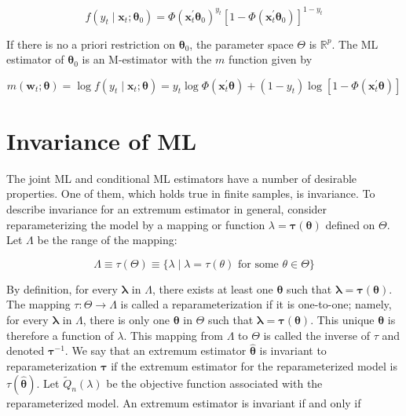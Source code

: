 \documentclass[10pt]{article}
\begin{document}
$$
f\left(y_{t} \mid \mathbf{x}_{t} ; \boldsymbol{\theta}_{0}\right)=\Phi\left(\mathbf{x}_{t}^{\prime} \boldsymbol{\theta}_{0}\right)^{y_{t}}\left[1-\Phi\left(\mathbf{x}_{t}^{\prime} \boldsymbol{\theta}_{0}\right)\right]^{1-y_{t}}
$$

If there is no a priori restriction on $\boldsymbol{\theta}_{0}$, the parameter space $\Theta$ is $\mathbb{R}^{p}$. The ML estimator of $\boldsymbol{\theta}_{0}$ is an M-estimator with the $m$ function given by


\begin{equation*}
m\left(\mathbf{w}_{t} ; \boldsymbol{\theta}\right)=\log f\left(y_{t} \mid \mathbf{x}_{t} ; \boldsymbol{\theta}\right)=y_{t} \log \Phi\left(\mathbf{x}_{t}^{\prime} \boldsymbol{\theta}\right)+\left(1-y_{t}\right) \log \left[1-\Phi\left(\mathbf{x}_{t}^{\prime} \boldsymbol{\theta}\right)\right] \tag{7.1.15}
\end{equation*}


\section*{Invariance of ML}
The joint ML and conditional ML estimators have a number of desirable properties. One of them, which holds true in finite samples, is invariance. To describe invariance for an extremum estimator in general, consider reparameterizing the model by a mapping or function $\lambda=\boldsymbol{\tau}(\boldsymbol{\theta})$ defined on $\Theta$. Let $\Lambda$ be the range of the mapping:


\begin{equation*}
\Lambda \equiv \tau(\Theta) \equiv\{\lambda \mid \lambda=\tau(\theta) \text { for some } \theta \in \Theta\} \tag{7.1.16}
\end{equation*}


By definition, for every $\boldsymbol{\lambda}$ in $\Lambda$, there exists at least one $\boldsymbol{\theta}$ such that $\boldsymbol{\lambda}=\boldsymbol{\tau}(\boldsymbol{\theta})$. The mapping $\tau: \Theta \rightarrow \Lambda$ is called a reparameterization if it is one-to-one; namely, for every $\boldsymbol{\lambda}$ in $\Lambda$, there is only one $\boldsymbol{\theta}$ in $\Theta$ such that $\boldsymbol{\lambda}=\boldsymbol{\tau}(\boldsymbol{\theta})$. This unique $\boldsymbol{\theta}$ is therefore a function of $\lambda$. This mapping from $\Lambda$ to $\Theta$ is called the inverse of $\tau$ and denoted $\boldsymbol{\tau}^{-1}$. We say that an extremum estimator $\hat{\boldsymbol{\theta}}$ is invariant to reparameterization $\boldsymbol{\tau}$ if the extremum estimator for the reparameterized model is $\tau(\hat{\boldsymbol{\theta}})$. Let $\widetilde{Q}_{n}(\lambda)$ be the objective function associated with the reparameterized model. An extremum estimator is invariant if and only if
\end{document}
